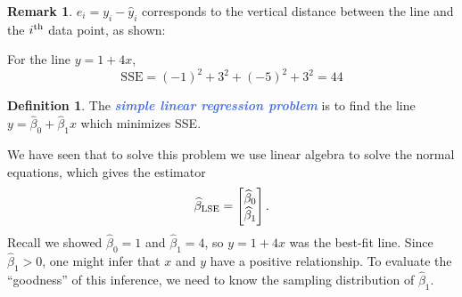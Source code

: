 \documentclass[10pt]{article}
\theoremstyle{definition}
\newtheorem{definition}[theorem]{Definition}
\newtheorem{remark}[theorem]{Remark}
\newcommand{\1}[1]{\textbf{1}_{\left[#1\right]}} %
\newcommand{\demph}[1]{\textcolor{RoyalBlue}{\textbf{\slshape #1}}} %
\begin{document}
\begin{remark}
  $e_{i}=y_{i}-\widehat{y}_{i}$ corresponds to the vertical distance between
  the line and the $i^{\rm th}$ data point, as shown:
\begin{center}
\end{center}
For the line $y= 1+4x$,
\begin{equation}
  \label{eq:SSE-example}
  \mathrm{SSE} = (-1)^{2}+ 3^{2}+(-5)^{2}+3^{2} = 44
\end{equation}
\end{remark}

\begin{definition}
  \label{def:simple-linear-regression-problem}
  The \demph{simple linear regression problem} is to find the line
  $y=\widehat{\beta}_{0}+\widehat{\beta}_{1}x$ which minimizes SSE.
\end{definition}
We have seen that to solve this problem we use linear algebra to solve the
normal equations, which gives the estimator
\begin{equation*}
  \widehat{\beta}_{\rm LSE} =
  \begin{bmatrix}
    \widehat{\beta}_{0}\\\widehat{\beta}_{1}
  \end{bmatrix}.
\end{equation*}
Recall we showed $\widehat{\beta}_{0}=1$ and $\widehat{\beta}_{1}=4$, so
$y=1+4x$ was the best-fit line. Since $\widehat{\beta}_{1}>0$, one might infer
that $x$ and $y$ have a positive relationship. To evaluate the ``goodness'' of
this inference, we need to know the sampling distribution of
$\widehat{\beta}_{1}$.
\end{document}
